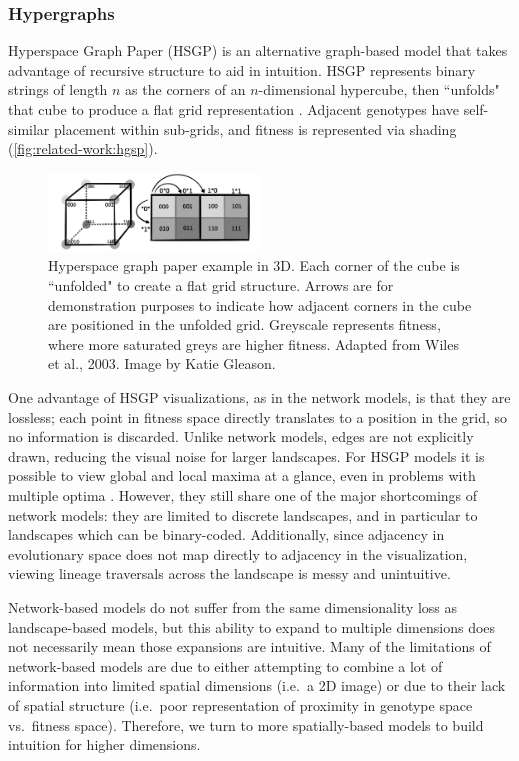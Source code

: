 \subsubsection{Hypergraphs}

Hyperspace Graph Paper (HSGP) is an alternative graph-based model that takes advantage of recursive structure to aid in intuition. 
HSGP represents binary strings of length $n$ as the corners of an $n$-dimensional hypercube, then ``unfolds" that cube to produce a flat grid representation \citep{wiles_hyperspace_2006}. 
Adjacent genotypes have self-similar placement within sub-grids, and fitness is represented via shading (\autoref{fig:related-work:hgsp}). 

\begin{figure}
    \centering
    \includegraphics[width=0.5\textwidth]{chapters/3-vr-viz/figs/hsgp.png}
    \caption{Hyperspace graph paper example in 3D. Each corner of the cube is ``unfolded" to create a flat grid structure. Arrows are for demonstration purposes to indicate how adjacent corners in the cube are positioned in the unfolded grid. Greyscale represents fitness, where more saturated greys are higher fitness. Adapted from Wiles et al., 2003. Image by Katie Gleason.}
    \label{fig:related-work:hgsp}
\end{figure}

One advantage of HSGP visualizations, as in the network models, is that they are lossless; each point in fitness space directly translates to a position in the grid, so no information is discarded. 
Unlike network models, edges are not explicitly drawn, reducing the visual noise for larger landscapes. 
For HSGP models it is possible to view global and local maxima at a glance, even in problems with multiple optima \citep{wiles_mapping_2003}. 
However, they still share one of the major shortcomings of network models: they are limited to discrete landscapes, and in particular to landscapes which can be binary-coded. 
Additionally, since adjacency in evolutionary space does not map directly to adjacency in the visualization, viewing lineage traversals across the landscape is messy and unintuitive. 

Network-based models do not suffer from the same dimensionality loss as landscape-based models, but this ability to expand to multiple dimensions does not necessarily mean those expansions are intuitive.
Many of the limitations of network-based models are due to either attempting to combine a lot of information into limited spatial dimensions (i.e.~a 2D image) or due to their lack of spatial structure (i.e.~poor representation of proximity in genotype space vs.~fitness space). 
Therefore, we turn to more spatially-based models to build intuition for higher dimensions.

